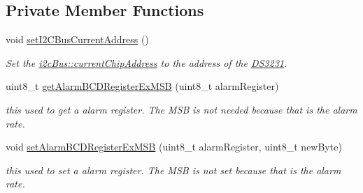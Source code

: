 \subsection*{Private Member Functions}
\begin{DoxyCompactItemize}
\item 
void \mbox{\hyperlink{class_d_s3231_ae6ef1547a0d2c2653ae3fe4c0f6a62ff}{set\+I2\+C\+Bus\+Current\+Address}} ()
\begin{DoxyCompactList}\small\item\em Set the \mbox{\hyperlink{classi2c_bus_a64ff87527c88619d72ede947d73eac3a}{i2c\+Bus\+::current\+Chip\+Address}} to the address of the \mbox{\hyperlink{class_d_s3231}{D\+S3231}}. \end{DoxyCompactList}\item 
uint8\+\_\+t \mbox{\hyperlink{class_d_s3231_a70033a61ca1965fa0aed9af31679355f}{get\+Alarm\+B\+C\+D\+Register\+Ex\+M\+SB}} (uint8\+\_\+t alarm\+Register)
\begin{DoxyCompactList}\small\item\em this used to get a alarm register. The M\+SB is not needed because that is the alarm rate. \end{DoxyCompactList}\item 
void \mbox{\hyperlink{class_d_s3231_a79280f7161eaa45b50fe649eda9c480a}{set\+Alarm\+B\+C\+D\+Register\+Ex\+M\+SB}} (uint8\+\_\+t alarm\+Register, uint8\+\_\+t new\+Byte)
\begin{DoxyCompactList}\small\item\em this used to set a alarm register. The M\+SB is not set because that is the alarm rate. \end{DoxyCompactList}\end{DoxyCompactItemize}
